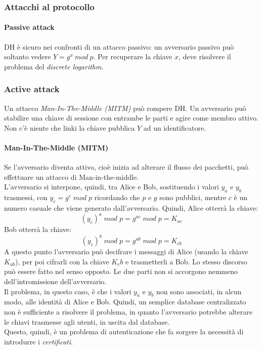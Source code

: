 \documentclass[a4paper,12pt]{article}
\begin{document}
\subsubsection{Attacchi al protocollo}

\paragraph{Passive attack}
DH è sicuro nei confronti di un attacco passivo: un avversario passivo può soltanto vedere $Y = g^x\ mod\ p$. Per recuperare la chiave $x$, deve risolvere il problema del \textit{discrete logarithm}.

\subsubsection{Active attack}
Un attacco \textit{Man-In-The-Middle (MITM)} può rompere DH. Un avversario può stabilire una chiave di sessione con entrambe le parti e agire come membro attivo. Non c'è niente che linki la chiave pubblica $Y$ ad un identificatore.

\paragraph{Man-In-The-Middle (MITM)} Se l'avversario diventa attivo, cioè inizia ad alterare il flusso dei pacchetti, può effettuare un attacco di Man-in-the-middle. \\
L'avversario si interpone, quindi, tra Alice e Bob, sostituendo i valori $y_a$ e $y_b$ trasmessi, con $y_c = g^c\;mod\;p$ ricordando che $p$ e $g$ sono pubblici, mentre $c$ è un numero casuale che viene generato dall'avversario.
Quindi, Alice otterrà la chiave: $$(y_c)^a\;mod\;p = g^{ac}\;mod\;p = K_{ac}$$
Bob otterrà la chiave: $$(y_c)^b\;mod\;p = g^{ab}\;mod\;p = K_{cb}$$
A questo punto l'avversario può decifrare i messaggi di Alice (usando la chiave $K_{ab}$), per poi cifrarli con la chiave $K_cb$ e trasmetterli a Bob. 
Lo stesso discorso può essere fatto nel senso opposto. Le due parti non si accorgono nemmeno dell'intromissione dell'avversario. \\
Il problema, in questo caso, è che i valori $y_a$ e $y_b$ non sono associati, in alcun modo, alle identità di Alice e Bob. Quindi, un semplice database centralizzato non è sufficiente a risolvere il problema, in quanto l'avversario potrebbe alterare le chiavi trasmesse agli utenti, in uscita dal database. \\
Questo, quindi, è un problema di autenticazione che fa sorgere la necessità di introdurre i \textit{certificati}.
\end{document}
